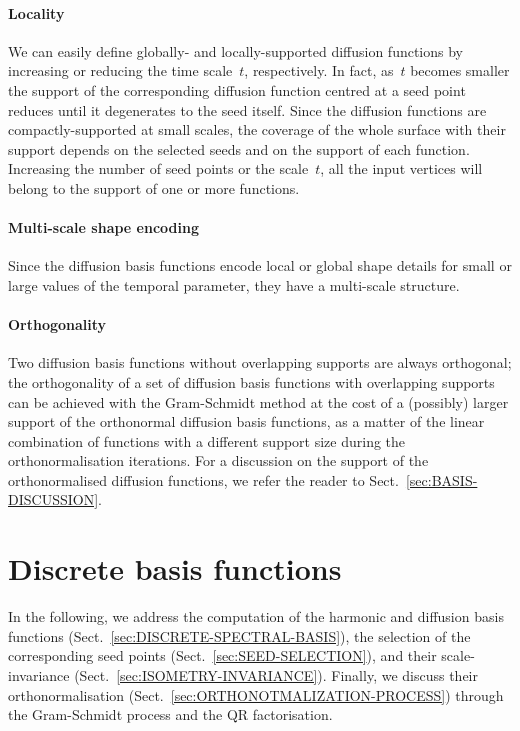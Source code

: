 \documentclass[acmtog,authorversion]{acmart}
\begin{document}
\paragraph*{Locality} 
We can easily define globally- and locally-supported diffusion functions by increasing or reducing the time scale~$t$, respectively. In fact, as~$t$ becomes smaller the support of the corresponding diffusion function centred at a seed point reduces until it degenerates to the seed itself. Since the diffusion functions are compactly-supported at small scales, the coverage of the whole surface with their support depends on the selected seeds and on the support of each function. Increasing the number of seed points or the scale~$t$, all the input vertices will belong to the support of one or more functions.

\paragraph*{Multi-scale shape encoding} 
Since the diffusion basis functions encode local or global shape details for small or large values of the temporal parameter, they have a multi-scale structure.

\paragraph*{Orthogonality}
Two diffusion basis functions without overlapping supports are always orthogonal; the orthogonality of a set of diffusion basis functions with overlapping supports can be achieved with the Gram-Schmidt method at the cost of a (possibly) larger support of the orthonormal diffusion basis functions, as a matter of the linear combination of functions with a different support size during the orthonormalisation iterations. For a discussion on the support of the orthonormalised diffusion functions, we refer the reader to Sect.~\ref{sec:BASIS-DISCUSSION}.

\section{Discrete basis functions\label{sec:COMPUTATION}}
In the following, we address the computation of the harmonic and diffusion basis functions (Sect.~\ref{sec:DISCRETE-SPECTRAL-BASIS}), the selection of the corresponding seed points (Sect.~\ref{sec:SEED-SELECTION}), and their scale-invariance (Sect.~\ref{sec:ISOMETRY-INVARIANCE}). Finally, we discuss their orthonormalisation (Sect.~\ref{sec:ORTHONOTMALIZATION-PROCESS}) through the Gram-Schmidt process and the QR factorisation.
\end{document}
